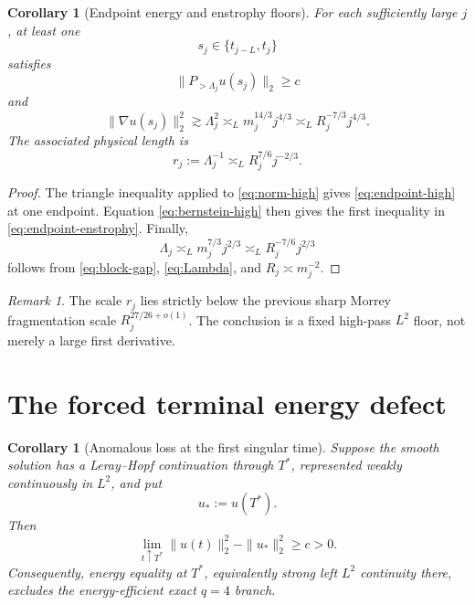 \documentclass[11pt]{article}
\newtheorem{corollary}[theorem]{Corollary}
\theoremstyle{remark}
\newtheorem{remark}[theorem]{Remark}
\begin{document}
\begin{corollary}[Endpoint energy and enstrophy floors]
\label{cor:endpoint}
For each sufficiently large \(j\), at least one
\[
 s_j\in\{t_{j-L},t_j\}
\]
satisfies
\begin{equation}
 \label{eq:endpoint-high}
 \|P_{>\Lambda_j}u(s_j)\|_2\geq c
\end{equation}
and
\begin{equation}
 \label{eq:endpoint-enstrophy}
 \boxed{
 \|\nabla u(s_j)\|_2^2
 \gtrsim
 \Lambda_j^2
 \asymp_L
 m_j^{14/3}j^{4/3}
 \asymp_L
 R_j^{-7/3}j^{4/3}.
 }
\end{equation}
The associated physical length is
\begin{equation}
 \label{eq:rclock}
 r_j:=\Lambda_j^{-1}
 \asymp_L
 R_j^{7/6}j^{-2/3}.
\end{equation}
\end{corollary}

\begin{proof}
The triangle inequality applied to \eqref{eq:norm-high} gives
\eqref{eq:endpoint-high} at one endpoint.  Equation
\eqref{eq:bernstein-high} then gives the first inequality in
\eqref{eq:endpoint-enstrophy}.  Finally,
\[
 \Lambda_j
 \asymp_Lm_j^{7/3}j^{2/3}
 \asymp_LR_j^{-7/6}j^{2/3}
\]
follows from \eqref{eq:block-gap}, \eqref{eq:Lambda}, and
\(R_j\asymp m_j^{-2}\).
\end{proof}

\begin{remark}
The scale \(r_j\) lies strictly below the previous sharp Morrey
fragmentation scale \(R_j^{27/26+o(1)}\).  The conclusion is a fixed
high-pass \(L^2\) floor, not merely a large first derivative.
\end{remark}

\section{The forced terminal energy defect}

\begin{corollary}[Anomalous loss at the first singular time]
\label{cor:defect}
Suppose the smooth solution has a Leray--Hopf continuation through
\(T^*\), represented weakly continuously in \(L^2\), and put
\[
 u_*:=u(T^*).
\]
Then
\begin{equation}
 \label{eq:defect}
 \boxed{
 \lim_{t\uparrow T^*}\|u(t)\|_2^2-\|u_*\|_2^2
 \geq c>0.
 }
\end{equation}
Consequently, energy equality at \(T^*\), equivalently strong left
\(L^2\) continuity there, excludes the energy-efficient exact \(q=4\)
branch.
\end{corollary}
\end{document}
